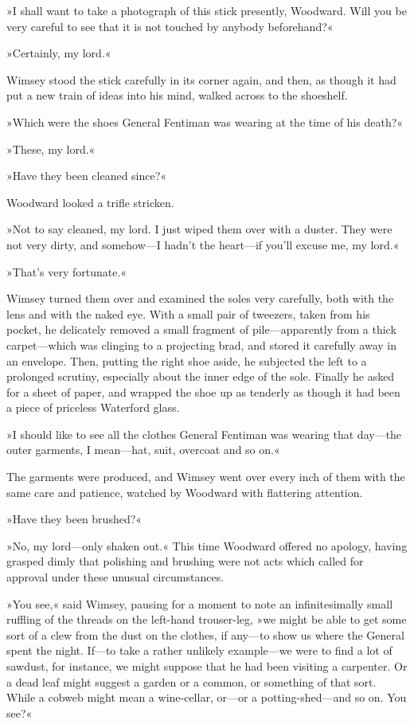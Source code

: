 »I shall want to take a photograph of this stick presently, Woodward. Will you be very careful to see that it is not touched by anybody beforehand?«

»Certainly, my lord.«

Wimsey stood the stick carefully in its corner again, and then, as though it had put a new train of ideas into his mind, walked across to the shoeshelf.

»Which were the shoes General Fentiman was wearing at the time of his death?«

»These, my lord.«

»Have they been cleaned since?«

Woodward looked a trifle stricken.

»Not to say cleaned, my lord. I just wiped them over with a duster. They were not very dirty, and somehow\allowbreak---\allowbreak I hadn't the heart\allowbreak---\allowbreak if you'll excuse me, my lord.«

»That's very fortunate.«

Wimsey turned them over and examined the soles very carefully, both with the lens and with the naked eye. With a small pair of tweezers, taken from his pocket, he delicately removed a small fragment of pile\allowbreak---\allowbreak apparently from a thick carpet\allowbreak---\allowbreak which was clinging to a projecting brad, and stored it carefully away in an envelope. Then, putting the right shoe aside, he subjected the left to a prolonged scrutiny, especially about the inner edge of the sole. Finally he asked for a sheet of paper, and wrapped the shoe up as tenderly as though it had been a piece of priceless Waterford glass.

»I should like to see all the clothes General Fentiman was wearing that day\allowbreak---\allowbreak the outer garments, I mean\allowbreak---\allowbreak hat, suit, overcoat and so on.«

The garments were produced, and Wimsey went over every inch of them with the same care and patience, watched by Woodward with flattering attention.

»Have they been brushed?«

»No, my lord\allowbreak---\allowbreak only shaken out.« This time Woodward offered no apology, having grasped dimly that polishing and brushing were not acts which called for approval under these unusual circumstances.

»You see,« said Wimsey, pausing for a moment to note an infinitesimally small ruffling of the threads on the left-hand trouser-leg, »we might be able to get some sort of a clew from the dust on the clothes, if any\allowbreak---\allowbreak to show us where the General spent the night. If\allowbreak---\allowbreak to take a rather unlikely example\allowbreak---\allowbreak we were to find a lot of sawdust, for instance, we might suppose that he had been visiting a carpenter. Or a dead leaf might suggest a garden or a common, or something of that sort. While a cobweb might mean a wine-cellar, or\allowbreak---\allowbreak or a potting-shed\allowbreak---\allowbreak and so on. You see?«

